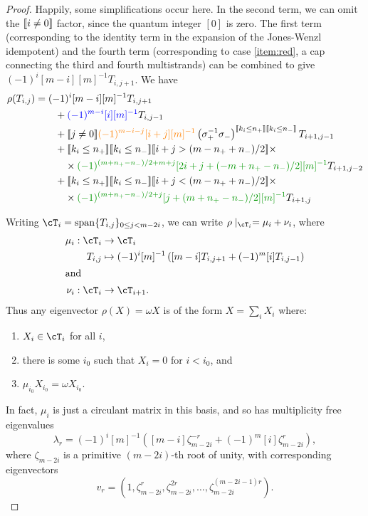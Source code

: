\documentclass[12pt]{article}
\begin{document}
\begin{proof}
Happily, some simplifications occur here. In the second term, we can omit the $[\![ i\neq0 ]\!]$ factor, since the quantum integer $[0]$ is zero. The first term (corresponding to the identity term in the expansion of the Jones-Wenzl idempotent) and the fourth term (corresponding to case \eqref{item:red}, a cap connecting the third and fourth multistrands) can be combined to give $(-1)^i [m-i][m]^{-1} T_{i,j+1}$. We have
\begin{align*}
\rho(T_{i,j}) & =
(-1)^i[m-i][m]^{-1} T_{i, j + 1} \\
& \qquad +
\textcolor{blue}{(-1)^{m-i} [i][m]^{-1}} T_{i,j-1} \\
& \qquad +
\truth{j \neq 0}\textcolor{orange}{(-1)^{m-i-j} [i+j][m]^{-1}} \left(\sigma_+^{-1} \sigma_-\right)^{\truth{k_i \leq n_+} \truth{k_i \leq n_-}} T_{i+1, j-1} \\
& \qquad +
\truth{k_i \leq n_+} \truth{k_i \leq n_-}
\truth{i+j > (m - n_+ + n_-)/2} \times \\
& \qquad \quad \times \textcolor{DarkGreen}{(-1)^{(m + n_+ - n_-)/2 +m +j} [2i + j + (-m + n_+ - n_-)/2][m]^{-1}} T_{i+1,j-2} \\
& \qquad +
\truth{k_i \leq n_+} \truth{k_i \leq n_-}
\truth{i+j < (m - n_+ + n_-)/2} \times \\
& \qquad \quad \times \textcolor{DarkGreen}{(-1)^{(m + n_+ - n_-)/2 + j} [j+ (m + n_+ - n_-)/2 ][m]^{-1}} T_{i+1,j}
\end{align*}


Writing $\cT_i = \Span \{ T_{i,j} \}_{0 \leq j < m- 2i}$, we can write $\rho \mid_{\cT_i} = \mu_i + \nu_i$, where
\begin{align*}
\mu_i :  \cT_i & \to \cT_i \\
  T_{i,j} & \mapsto (-1)^i [m]^{-1} \left( [m-i] T_{i,j+1} + (-1)^{m}[i] T_{i,j-1}\right) \\
\intertext{and}
\nu_i : \cT_i & \to \cT_{i+1}.
\end{align*}
Thus any eigenvector $\rho(X) = \omega X$ is of the form $X = \sum_i X_i$ where:
\begin{enumerate}[(1)]
\item
$X_i\in \cT_i$ for all $i$, 
\item
there is some $i_0$ such that $X_i = 0$ for $i < i_0$, and 
\item
$\mu_{i_0} X_{i_0} = \omega X_{i_0}$.
\end{enumerate}

In fact, $\mu_i$ is just a circulant matrix in this basis, and so has multiplicity free eigenvalues
$$\lambda_r = (-1)^i[m]^{-1} \left([m-i] \zeta_{m-2i}^{-r} + (-1)^{m}[i] \zeta_{m-2i}^r\right),$$
where $\zeta_{m-2i}$ is a primitive $(m-2i)$-th root of unity, with corresponding eigenvectors
$$v_r = \left(1, \zeta_{m-2i}^r , \zeta_{m-2i}^{2r} , \ldots, \zeta_{m-2i}^{(m-2i-1)r} \right).$$


\end{proof}
\end{document}
